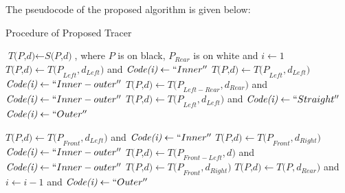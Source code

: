 
The pseudocode of the proposed algorithm is given below: 

\begin{algorithm}
	\caption{Procedure of Proposed Tracer}
	\label{alg:proposed}
	\begin{algorithmic}[1]
	\State $\textit{T(P,d)} \gets \textit{S(P,d)}$, where $P$ is on black, $P_{Rear}$ is on white and $i \gets 1$
	\Do
			\State $\textit{T(P,d)} \gets \textit{T(P}_{Left},\textit{d}_{Left} )  $ and $\textit{Code(i)} \gets ``Inner''$
			\State $\textit{T(P,d)} \gets \textit{T(P}_{Left}, \textit{d}_{Left})$
		\Else
			\State $\textit{Code(i)} \gets ``Inner-outer''$
			\State $\textit{T(P,d)} \gets \textit{T(P}_{Left-Rear},\textit{d}_{Rear} )  $ and $\textit{Code(i)} \gets ``Inner-outer''$
		\EndIf
	\Else
			\State $\textit{T(P,d)} \gets \textit{T(P}_{Left},\textit{d}_{Left} )  $ and $\textit{Code(i)} \gets ``Straight''$
		\Else
			\State $\textit{Code(i)} \gets ``Outer''$
		\EndIf
	\EndIf


			\State $\textit{T(P,d)} \gets \textit{T(P}_{Front},\textit{d}_{Left} )  $ and $\textit{Code(i)} \gets ``Inner''$
			\State $\textit{T(P,d)} \gets \textit{T(P}_{Front}, \textit{d}_{Right})$
		\Else
			\State $\textit{Code(i)} \gets ``Inner-outer''$
			\State $\textit{T(P,d)} \gets \textit{T(P}_{Front-Left},\textit{d} )  $ and $\textit{Code(i)} \gets ``Inner-outer''$
		\EndIf
		\State $\textit{T(P,d)} \gets \textit{T(P}_{Front},\textit{d}_{Right} )  $
	\Else
		\State $\textit{T(P,d)} \gets \textit{T(P},\textit{d}_{Rear} )  $ and $i \gets i-1$ and $\textit{Code(i)} \gets ``Outer''$
	\EndIf


	\EndProcedure
	\end{algorithmic}
\end{algorithm}



